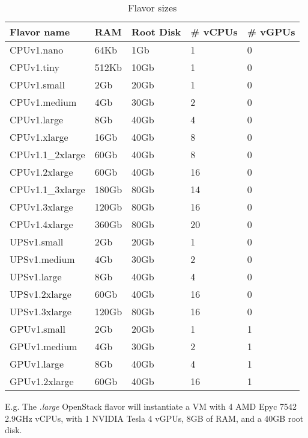 \begin{table}[h!]
\centering
\begin{tabular}{ |p{3cm}|p{3cm}|p{3cm}|p{3cm}|p{3cm}| }
  \hline
  \rowcolor{lightgray} \textbf{Flavor name} & \textbf{RAM} & \textbf{Root Disk} & \textbf{\# vCPUs} & \textbf{\# vGPUs} \\
  \hline
  CPUv1.nano & 64Kb & 1Gb & 1 & 0 \\
  \hline
  CPUv1.tiny & 512Kb & 10Gb & 1 & 0 \\
  \hline
  CPUv1.small & 2Gb & 20Gb & 1 & 0 \\
  \hline
  CPUv1.medium & 4Gb & 30Gb & 2 & 0 \\
  \hline
  CPUv1.large & 8Gb & 40Gb & 4 & 0 \\
  \hline
  CPUv1.xlarge & 16Gb & 40Gb & 8 & 0 \\
  \hline
  CPUv1.1_2xlarge & 60Gb & 40Gb & 8 & 0 \\
  \hline
  CPUv1.2xlarge & 60Gb & 40Gb & 16 & 0 \\  
  \hline
  CPUv1.1_3xlarge & 180Gb & 80Gb & 14 & 0 \\
  \hline
  CPUv1.3xlarge & 120Gb & 80Gb & 16 & 0 \\
  \hline
  CPUv1.4xlarge & 360Gb & 80Gb & 20 & 0 \\
  \hline
  UPSv1.small & 2Gb & 20Gb & 1 & 0 \\
  \hline
  UPSv1.medium & 4Gb & 30Gb & 2 & 0 \\
  \hline
  UPSv1.large & 8Gb & 40Gb & 4 & 0 \\
  \hline
  UPSv1.2xlarge & 60Gb & 40Gb & 16 & 0 \\
  \hline
  UPSv1.3xlarge & 120Gb & 80Gb & 16 & 0 \\
  \hline
  GPUv1.small & 2Gb & 20Gb & 1 & 1 \\
  \hline
  GPUv1.medium & 4Gb & 30Gb & 2 & 1 \\
  \hline
  GPUv1.large & 8Gb & 40Gb & 4 & 1 \\
  \hline
  GPUv1.2xlarge & 60Gb & 40Gb & 16 & 1 \\
  \hline
\end{tabular}
\caption{Flavor sizes}
\label{table:flavor-size}
\end{table}


E.g. The .\emph{large} OpenStack flavor will instantiate a
VM with 4 AMD Epyc 7542 2.9GHz vCPUs, with 1 NVIDIA Tesla 4 vGPUs, 8GB
of RAM, and a 40GB root disk.


